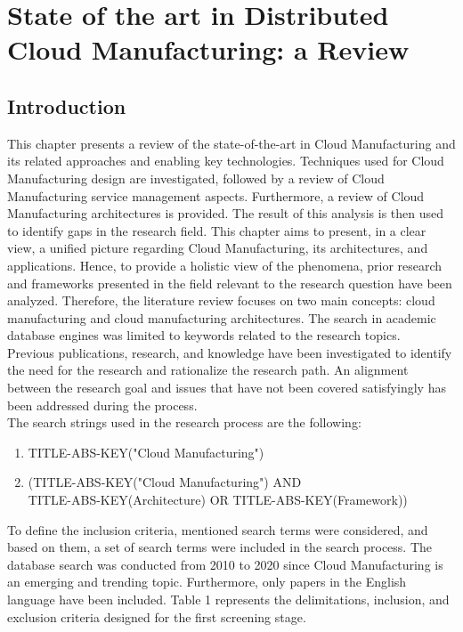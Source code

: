 \chapter{State of the art in Distributed Cloud Manufacturing: a Review}
\label{chapter2}
\section{Introduction}
This chapter presents a review of the state-of-the-art in Cloud Manufacturing and its related approaches and enabling key technologies. Techniques used for Cloud Manufacturing design are investigated, followed by a review of Cloud Manufacturing service management aspects. Furthermore, a review of Cloud Manufacturing architectures is provided. The result of this analysis is then used to identify gaps in the research field. This chapter aims to present, in a clear view, a unified picture regarding Cloud Manufacturing, its architectures, and applications. Hence, to provide a holistic view of the phenomena, prior research and frameworks presented in the field relevant to the research question have been analyzed. Therefore, the literature review focuses on two main concepts: cloud manufacturing and cloud manufacturing architectures. The search in academic database engines was limited to keywords related to the research topics.\\
Previous publications, research, and knowledge have been investigated to identify the need for the research and rationalize the research path. An alignment between the research goal and issues that have not been covered satisfyingly has been addressed during the process.\\
The search strings used in the research process are the following:
\begin{enumerate}
    \item TITLE-ABS-KEY("Cloud Manufacturing")
    \item (TITLE-ABS-KEY("Cloud Manufacturing") AND \\ TITLE-ABS-KEY(Architecture) OR TITLE-ABS-KEY(Framework))
\end{enumerate}
To define the inclusion criteria, mentioned search terms were considered, and based on them, a set of search terms were included in the search process. The database search was conducted from 2010 to 2020 since Cloud Manufacturing is an emerging and trending topic. Furthermore, only papers in the English language have been included. Table 1 represents the delimitations, inclusion, and exclusion criteria designed for the first screening stage.\\
